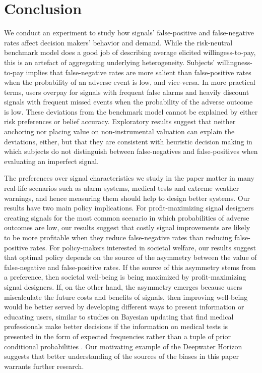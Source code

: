 \documentclass[12pt,a4paper]{article}
\begin{document}
\vspace{10pt}
\section{Conclusion}\label{sec:conclusion}

We conduct an experiment to study how signals' false-positive and false-negative rates affect decision makers' behavior and demand.  While the risk-neutral benchmark model does a good job of describing average elicited willingess-to-pay, this is an artefact of aggregating underlying heterogeneity.  Subjects' willingness-to-pay implies that false-negative rates are more salient than false-positive rates when the probability of an adverse event is low, and vice-versa. In more practical terms, users overpay for signals with frequent false alarms and heavily discount signals with frequent missed events when the probability of the adverse outcome is low. These deviations from the benchmark model cannot be explained by either risk preferences or belief accuracy.  Exploratory results suggest that neither anchoring nor placing value on non-instrumental valuation can explain the deviations, either, but that they are consistent with heuristic decision making in which subjects do not distinguish between false-negatives and false-positives when evaluating an imperfect signal.       

The preferences over signal characteristics we study in the paper matter in many real-life scenarios such as alarm systems, medical tests and extreme weather warnings, and hence measuring them should help to design better systems.  Our results have two main policy implications.  For profit-maximizing signal designers creating signals for the most common scenario in which probabilities of adverse outcomes are low, our results suggest that costly signal improvements are likely to be more profitable when they reduce false-negative rates than reducing false-positive rates. For policy-makers interested in societal welfare, our results suggest that optimal policy depends on the source of the asymmetry between the value of false-negative and false-positive rates.  If the source of this asymmetry stems from a preference, then societal well-being is being maximized by profit-maximizing signal designers.  If, on the other hand, the asymmetry emerges because users miscalculate the future costs and benefits of signals, then improving well-being would be better served by developing different ways to present information or educating users, similar to studies on Bayesian updating that find medical professionals make better decisions if the information on medical tests is presented in the form of expected frequencies rather than a tuple of prior conditional probabilities \citep{hoffrage_natural_2015, mcdowell_meta-analysis_2017}. Our motivating example of the Deepwater Horizon suggests that better understanding of the sources of the biases in this paper warrants further research. 
\end{document}
